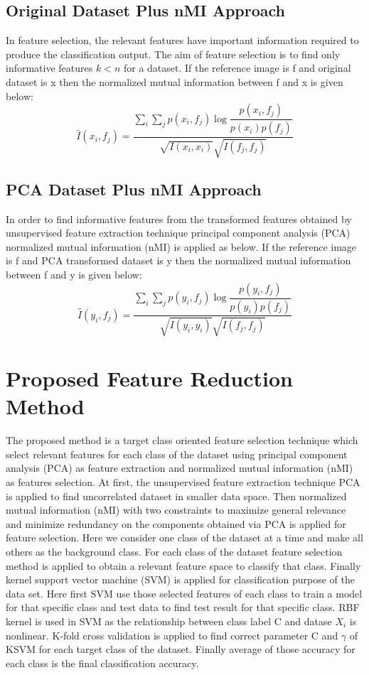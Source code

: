 \documentclass[document.tex]{subfiles}
\begin{document}
\subsection{Original Dataset Plus nMI Approach}
\noindent In feature selection, the relevant features have important
information required to produce the classification output. The aim of feature selection is to find only informative features $k < n$ for a dataset. If the reference image is f and original dataset is x then the normalized mutual information between f and x is given below:
\begin{equation}
\hat{I}(x_i,f_j) = \dfrac{\sum_{i}\sum_{j} p(x_i,f_j)\log\dfrac{p(x_i,f_j)}{p(x_i)p(f_j)}}{\sqrt{I(x_i,x_i)}\sqrt{I(f_j,f_j)}}
\end{equation}  

\subsection{PCA Dataset Plus nMI Approach}
\noindent In order to find informative features from the transformed features
obtained by unsupervised feature extraction technique principal component analysis (PCA) normalized mutual information (nMI) is applied as below. If the reference image is f and PCA transformed dataset is y then the normalized mutual information between f and y is given below:
\begin{equation}
\hat{I}(y_i,f_j) = \dfrac{\sum_{i}\sum_{j} p(y_i,f_j)\log\dfrac{p(y_i,f_j)}{p(y_i)p(f_j)}}{\sqrt{I(y_i,y_i)}\sqrt{I(f_j,f_j)}}
\end{equation}  

\section{Proposed Feature Reduction Method}
\noindent The proposed method is a target class oriented feature selection technique which select relevant features for each class of the dataset using principal component analysis (PCA) as feature extraction\cite{7} and normalized mutual information (nMI) as features selection\cite{9}. At first, the unsupervised feature extraction technique PCA is applied to find uncorrelated dataset in smaller data space. Then normalized mutual information (nMI) with two constraints to maximize general relevance and minimize redundancy on the components obtained via PCA is applied for feature selection\cite{21}. Here we consider one class of the dataset at a time and make all others as the background class. For each class of the dataset feature selection method is applied to obtain a relevant feature space to classify that class. Finally kernel support vector machine (SVM) is applied for classification purpose of the data set\cite{11}. Here first SVM use those selected features of each class to train a model for that specific class and test data to find test result for that specific class. RBF kernel\cite{22} is used in SVM as the relationship between class label C and datase $X_i$ is nonlinear. K-fold cross validation is applied to find correct parameter C and $\gamma$ of KSVM for each target class of the dataset. Finally average of those accuracy for each class is the final classification accuracy.
\end{document}
